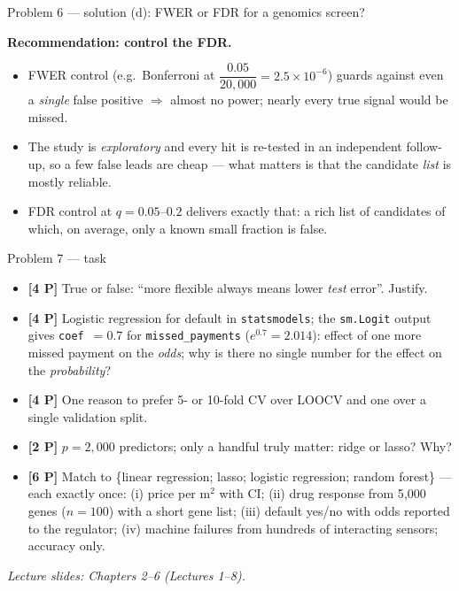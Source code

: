\documentclass[aspectratio=169,11pt]{beamer}
\begin{document}
\begin{frame}{Problem 6 --- solution (d): FWER or FDR for a genomics screen?}
  \begin{solutionbox}
    \textbf{Recommendation: control the FDR.}
    \begin{itemize}
      \item FWER control (e.g.\ Bonferroni at $\dfrac{0.05}{20{,}000}=2.5\times10^{-6}$) guards
        against even a \emph{single} false positive $\Rightarrow$ almost no power; nearly every
        true signal would be missed.
      \item The study is \emph{exploratory} and every hit is re-tested in an independent follow-up,
        so a few false leads are cheap --- what matters is that the candidate \emph{list} is mostly
        reliable.
      \item FDR control at $q=0.05$--$0.2$ delivers exactly that: a rich list of candidates of
        which, on average, only a known small fraction is false.
    \end{itemize}
  \end{solutionbox}
\end{frame}

\begin{frame}{Problem 7 --- task}
  \begin{exercise}
    \begin{itemize}
      \item[(a)] \textbf{[4 P]} True or false: ``more flexible always means lower \emph{test}
        error''. Justify.
      \item[(b)] \textbf{[4 P]} Logistic regression for default in \texttt{statsmodels}; the
        \texttt{sm.Logit} output gives \texttt{coef}~$=0.7$ for \texttt{missed\_payments}
        ($e^{0.7}=2.014$): effect of one more missed payment on the \emph{odds}; why is
        there no single number for the effect on the \emph{probability}?
      \item[(c)] \textbf{[4 P]} One reason to prefer 5- or 10-fold CV over LOOCV and one over a
        single validation split.
      \item[(d)] \textbf{[2 P]} $p=2{,}000$ predictors; only a handful truly matter:
        ridge or lasso? Why?
      \item[(e)] \textbf{[6 P]} Match to \{linear regression; lasso; logistic regression;
        random forest\} --- each exactly once: (i) price per m$^2$ with CI;
        (ii) drug response from 5{,}000 genes ($n=100$) with a short gene list;
        (iii) default yes/no with odds reported to the regulator;
        (iv) machine failures from hundreds of interacting sensors; accuracy only.
    \end{itemize}
  \end{exercise}
  {\scriptsize\itshape Lecture slides: Chapters 2--6 (Lectures 1--8).}
\end{frame}
\end{document}
